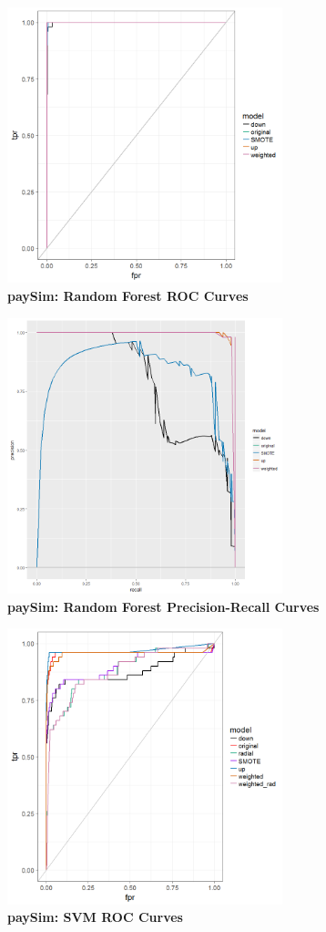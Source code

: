 \documentclass[12pt,]{article}
\begin{document}
\includegraphics[width=0.6\textwidth,height=\textheight]{figures/paysim/paySim_randfor_rocs.png}\\
\textbf{paySim: Random Forest ROC Curves}

\includegraphics[width=0.6\textwidth,height=\textheight]{figures/paysim/paySim_randfor_PR.png}\\
\textbf{paySim: Random Forest Precision-Recall Curves}

\includegraphics[width=0.6\textwidth,height=\textheight]{figures/paysim/paySim_svm_rocs.png}\\
\textbf{paySim: SVM ROC Curves}
\end{document}
